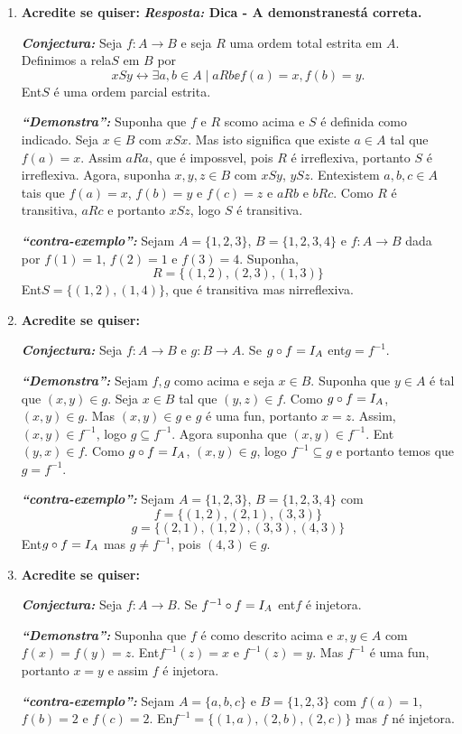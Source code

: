 \begin{enumerate}[{\bf 1.}]
\item {\bf Acredite se quiser:}  {\bf{\it Resposta:} Dica - A demonstra\cao n\ao est\'a correta.}

\noindent \textit{\textbf{Conjectura:}} Seja $f:A\to B$ e seja $R$ uma ordem total estrita em $A$. Definimos a rela\cao $S$ em $B$ por
\[
xSy \leftrightarrow \exists a,b\in A \mid  aRb\ee f(a)=x,f(b)=y.
\]
Ent\ao $S$ \'e uma ordem parcial estrita.

\noindent \textit{\textbf{``Demonstra\caoi'':}} Suponha que $f$ e $ R$ s\ao como acima e $S$ \'e definida como indicado. Seja $x\in B$ com $xSx$. Mas isto significa que existe $a\in A$ tal que $f(a)=x$. Assim $aRa$, que \'e imposs\ih vel, pois $R$ \'e irreflexiva, portanto $S$ \'e irreflexiva. Agora, suponha $x,y,z\in B$ com $xSy$, $ySz$. Ent\ao existem $a,b,c\in A$ tais que $f(a)=x$, $f(b)=y$ e $f(c)=z$ e $aRb$ e $bRc$. Como $R$ \'e transitiva, $aRc$ e portanto $xSz$, logo $S$ \'e transitiva.

\noindent \textit{\textbf{``contra-exemplo'':}} Sejam $A=\{1,2,3\}$, $B=\{1,2,3,4\}$ e $f:A\to B$ dada por $f(1)=1$, $f(2)=1$ e $f(3)=4$. Suponha,
\[
R=\{(1,2),(2,3),(1,3)\}
\]
Ent\ao $S=\{(1,2),(1,4)\}$, que \'e transitiva mas n\ao irreflexiva.

\item {\bf Acredite se quiser:}  

\noindent \textit{\textbf{Conjectura:}} Seja $f:A\to B$ e $g:B\to A$. Se $g\circ f=I_A$ ent\ao $g=f^{-1}$.

\noindent \textit{\textbf{``Demonstra\caoi'':}} Sejam $f,g$ como acima e seja $x\in B$. Suponha que $y\in A$ \'e tal que $(x,y)\in g$. Seja $x\in B$ tal que $(y,z) \in f$. Como $g\circ f=I_A$, $(x,y)\in g$. Mas $(x,y)\in g$ e $g$ \'e uma fun\caoi, portanto $x=z$. Assim, $(x,y)\in f^{-1}$, logo $g\subseteq f^{-1}$. Agora suponha que $(x,y)\in f^{-1}$. Ent\ao $(y,x)\in f$. Como $g\circ f=I_A$, $(x,y)\in g$, logo $f^{-1}\subseteq g$ e portanto temos que $g=f^{-1}$.

\noindent \textit{\textbf{``contra-exemplo'':}} Sejam $A=\{1,2,3\}$, $B=\{1,2,3,4\}$ com
\[
f=\{(1,2),(2,1),(3,3)\}
\]
\[
g=\{(2,1),(1,2),(3,3),(4,3)\}
\]
Ent\ao $g\circ f=I_A$ mas $g\neq f^{-1}$, pois $(4,3)\in g$.

\item {\bf Acredite se quiser:}  

\noindent \textit{\textbf{Conjectura:}} Seja $f:A\to B$. Se $f^{-1}\circ f=I_A$ ent\ao $f$ \'e injetora.

\noindent \textit{\textbf{``Demonstra\caoi'':}} Suponha que $f$ \'e como descrito acima e $x,y\in A$ com $f(x)=f(y)=z$. Ent\ao $f^{-1}(z)=x$ e $f^{-1}(z)=y$. Mas $f^{-1}$ \'e uma fun\caoi, portanto $x=y$ e assim $f$ \'e injetora.

\noindent \textit{\textbf{``contra-exemplo'':}} Sejam $A=\{a,b,c\}$ e $B=\{1,2,3\}$ com $f(a)=1$, $f(b)=2$ e $f(c)=2$. En\tao $f^{-1}=\{(1,a),(2,b),(2,c)\}$ mas $f$ n\ao \'e injetora.
\end{enumerate}

